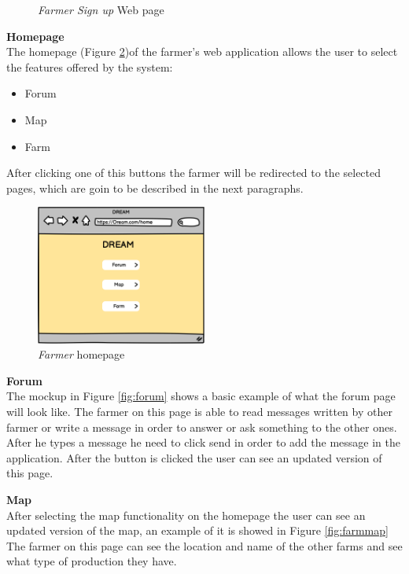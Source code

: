 \begin{figure}[H]
\begin{minipage}{0.39\textwidth}
        \caption{\emph{Farmer Sign up} Web page}
        \label{fig:mockupSignUp}
    \end{minipage}
\end{figure}

\textbf{Homepage}\\
The homepage (Figure \ref{fig:farmhome})of the farmer's web application allows the user to select the features offered by the system:
\begin{itemize}
    \item Forum
    \item Map
    \item Farm
\end{itemize}
After clicking one of this buttons the farmer will be redirected to the selected pages, which are goin to be described in the next paragraphs.

\begin{figure}[H]
    \begin{center}
    \includegraphics[width=0.5\textwidth]{images/mockups/FHome.png}
    \caption{\emph{Farmer} homepage}
    \label{fig:farmhome}
    \end{center}
\end{figure}

\textbf{Forum}\\
The mockup in Figure \ref{fig:forum} shows a basic example of what the forum page will look like. The farmer on this page is able to read messages written by other farmer or 
write a message in order to answer or ask something to the other ones. After he types a message he need to click send in order to add the message in the application. 
After the button is clicked the user can see an updated version of this page.

\textbf{Map}\\
After selecting the map functionality on the homepage the user can see an updated version of the map, 
an example of it is showed in Figure \ref{fig:farmmap} The farmer on this page can see the location and name of the other farms and see what type of production 
they have.

